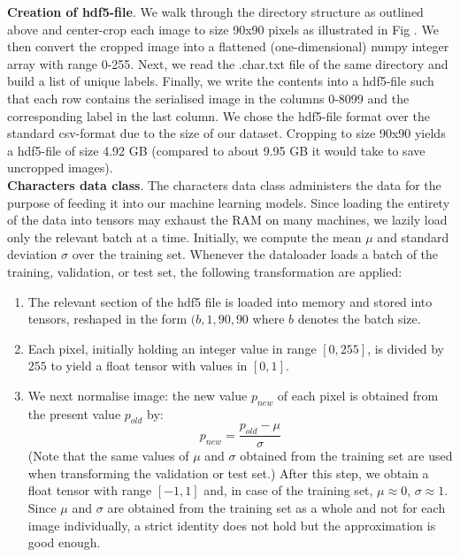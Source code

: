 \documentclass[british,12p]{article}
\begin{document}
    	
    	\textbf{Creation of hdf5-file}. We walk through the directory structure as outlined above and center-crop each image to size 90x90 pixels as illustrated in Fig . We then convert the cropped image into a flattened (one-dimensional) numpy integer array with range 0-255. Next, we read the .char.txt file of the same directory and build a list of unique labels. Finally, we write the contents into a hdf5-file such that each row contains the serialised image in the columns 0-8099 and the corresponding label in the last column. We chose the hdf5-file format over the standard csv-format due to the size of our dataset. Cropping to size 90x90 yields a hdf5-file of size 4.92 GB (compared to about 9.95 GB it would take to save uncropped images).\\
    	
    	
    	\textbf{Characters data class}. The characters data class administers the data for the purpose of feeding it into our machine learning models. Since loading the entirety of the data into tensors may exhaust the RAM on many machines, we lazily load only the relevant batch at a time. Initially, we compute the mean $\mu$ and standard deviation $\sigma$ over the training set. Whenever the dataloader loads a batch of the training, validation, or test set, the following transformation are applied:
    	\begin{enumerate}
    		\item The relevant section of the hdf5 file is loaded into memory and stored into tensors, reshaped in the form $(b, 1, 90, 90$ where $b$ denotes the batch size.
    		\item Each pixel, initially holding an integer value in range $[0, 255]$, is divided by $255$ to yield a float tensor with values in $[0, 1]$.
    		\item We next normalise image: the new value $p_{new}$ of each pixel is obtained from the present value $p_{old}$ by: $$ p_{new} = \frac{p_{old} - \mu}{\sigma}$$ (Note that the same values of $\mu$ and $\sigma$  obtained from the training set are used when transforming the validation or test set.) After this step, we obtain a float tensor with range $[-1, 1]$ and, in case of the training set, $\mu \approx 0$, $\sigma \approx 1$. Since $\mu$ and $\sigma$ are obtained from the training set as a whole and not for each image individually, a strict identity does not hold but the approximation is good enough.
    	\end{enumerate}
    	
\end{document}
